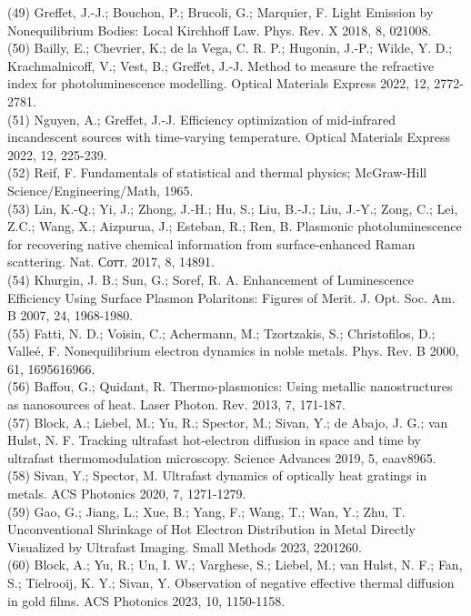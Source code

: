 \documentclass[10pt]{article}
\begin{document}
(49) Greffet, J.-J.; Bouchon, P.; Brucoli, G.; Marquier, F. Light Emission by Nonequilibrium Bodies: Local Kirchhoff Law. Phys. Rev. X 2018, 8, 021008.\\
(50) Bailly, E.; Chevrier, K.; de la Vega, C. R. P.; Hugonin, J.-P.; Wilde, Y. D.; Krachmalnicoff, V.; Vest, B.; Greffet, J.-J. Method to measure the refractive index for photoluminescence modelling. Optical Materials Express 2022, 12, 2772-2781.\\
(51) Nguyen, A.; Greffet, J.-J. Efficiency optimization of mid-infrared incandescent sources with time-varying temperature. Optical Materials Express 2022, 12, 225-239.\\
(52) Reif, F. Fundamentals of statistical and thermal physics; McGraw-Hill Science/Engineering/Math, 1965.\\
(53) Lin, K.-Q.; Yi, J.; Zhong, J.-H.; Hu, S.; Liu, B.-J.; Liu, J.-Y.; Zong, C.; Lei, Z.C.; Wang, X.; Aizpurua, J.; Esteban, R.; Ren, B. Plasmonic photoluminescence for recovering native chemical information from surface-enhanced Raman scattering. Nat. Сотт. 2017, 8, 14891.\\
(54) Khurgin, J. B.; Sun, G.; Soref, R. A. Enhancement of Luminescence Efficiency Using Surface Plasmon Polaritons: Figures of Merit. J. Opt. Soc. Am. B 2007, 24, 1968-1980.\\
(55) Fatti, N. D.; Voisin, C.; Achermann, M.; Tzortzakis, S.; Christofilos, D.; Valleé, F. Nonequilibrium electron dynamics in noble metals. Phys. Rev. B 2000, 61, 1695616966.\\
(56) Baffou, G.; Quidant, R. Thermo-plasmonics: Using metallic nanostructures as nanosources of heat. Laser Photon. Rev. 2013, 7, 171-187.\\
(57) Block, A.; Liebel, M.; Yu, R.; Spector, M.; Sivan, Y.; de Abajo, J. G.; van Hulst, N. F. Tracking ultrafast hot-electron diffusion in space and time by ultrafast thermomodulation microscopy. Science Advances 2019, 5, eaav8965.\\
(58) Sivan, Y.; Spector, M. Ultrafast dynamics of optically heat gratings in metals. ACS Photonics 2020, 7, 1271-1279.\\
(59) Gao, G.; Jiang, L.; Xue, B.; Yang, F.; Wang, T.; Wan, Y.; Zhu, T. Unconventional Shrinkage of Hot Electron Distribution in Metal Directly Visualized by Ultrafast Imaging. Small Methods 2023, 2201260.\\
(60) Block, A.; Yu, R.; Un, I. W.; Varghese, S.; Liebel, M.; van Hulst, N. F.; Fan, S.; Tielrooij, K. Y.; Sivan, Y. Observation of negative effective thermal diffusion in gold films. ACS Photonics 2023, 10, 1150-1158.\\
\end{document}
